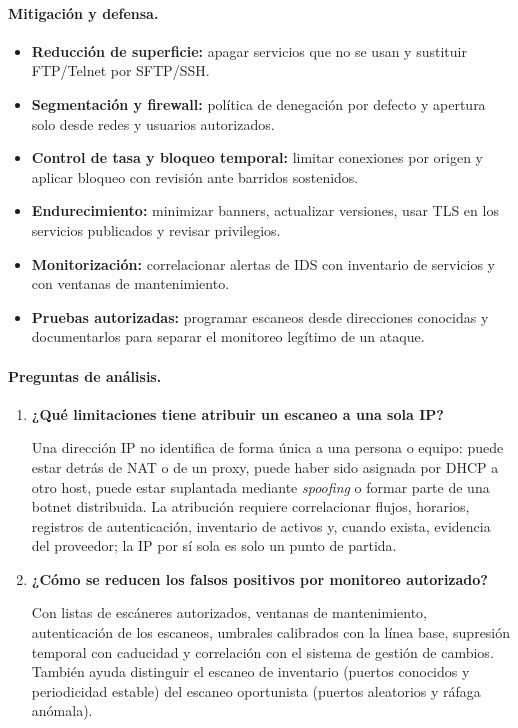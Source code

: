 \paragraph{Mitigación y defensa.}
\begin{itemize}
	\item \textbf{Reducción de superficie:} apagar servicios que no se usan y sustituir FTP/Telnet por SFTP/SSH.
	\item \textbf{Segmentación y firewall:} política de denegación por defecto y apertura solo desde redes y usuarios autorizados.
	\item \textbf{Control de tasa y bloqueo temporal:} limitar conexiones por origen y aplicar bloqueo con revisión ante barridos sostenidos.
	\item \textbf{Endurecimiento:} minimizar banners, actualizar versiones, usar TLS en los servicios publicados y revisar privilegios.
	\item \textbf{Monitorización:} correlacionar alertas de IDS con inventario de servicios y con ventanas de mantenimiento.
	\item \textbf{Pruebas autorizadas:} programar escaneos desde direcciones conocidas y documentarlos para separar el monitoreo legítimo de un ataque.
\end{itemize}

\paragraph{Preguntas de análisis.}
\begin{enumerate}
	\item \textbf{¿Qué limitaciones tiene atribuir un escaneo a una sola IP?}\par
	Una dirección IP no identifica de forma única a una persona o equipo: puede estar detrás de NAT o de un proxy, puede haber sido asignada por DHCP a otro host, puede estar suplantada mediante \textit{spoofing} o formar parte de una botnet distribuida. La atribución requiere correlacionar flujos, horarios, registros de autenticación, inventario de activos y, cuando exista, evidencia del proveedor; la IP por sí sola es solo un punto de partida.
	\item \textbf{¿Cómo se reducen los falsos positivos por monitoreo autorizado?}\par
	Con listas de escáneres autorizados, ventanas de mantenimiento, autenticación de los escaneos, umbrales calibrados con la línea base, supresión temporal con caducidad y correlación con el sistema de gestión de cambios. También ayuda distinguir el escaneo de inventario (puertos conocidos y periodicidad estable) del escaneo oportunista (puertos aleatorios y ráfaga anómala).
\end{enumerate}

